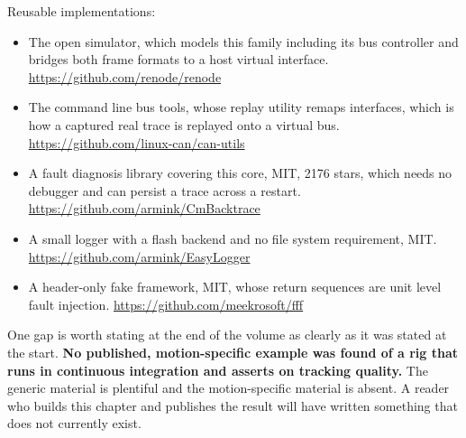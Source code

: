 Reusable implementations:
\begin{itemize}
\item The open simulator, which models this family including its bus controller
and bridges both frame formats to a host virtual interface.\newline
\url{https://github.com/renode/renode}
\item The command line bus tools, whose replay utility remaps interfaces, which
is how a captured real trace is replayed onto a virtual bus.\newline
\url{https://github.com/linux-can/can-utils}
\item A fault diagnosis library covering this core, MIT, 2176 stars, which needs
no debugger and can persist a trace across a restart.\newline
\url{https://github.com/armink/CmBacktrace}
\item A small logger with a flash backend and no file system requirement,
MIT.\newline
\url{https://github.com/armink/EasyLogger}
\item A header-only fake framework, MIT, whose return sequences are unit level
fault injection.\newline
\url{https://github.com/meekrosoft/fff}
\end{itemize}

One gap is worth stating at the end of the volume as clearly as it was stated at
the start. \textbf{No published, motion-specific example was found of a rig that
runs in continuous integration and asserts on tracking quality.} The generic
material is plentiful and the motion-specific material is absent. A reader who
builds this chapter and publishes the result will have written something that
does not currently exist.
